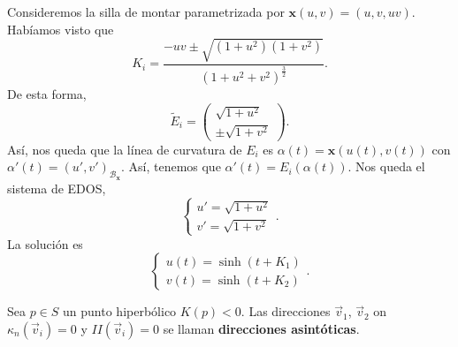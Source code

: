 \begin{eg}
Consideremos la silla de montar parametrizada por $\displaystyle \textbf{x} \left(u,v\right)=\left(u,v,uv\right) $. Habíamos visto que 
\[K_{i}=\frac{-uv \pm \sqrt{\left(1 + u^{2}\right)\left(1 + v^{2}\right)}}{\left(1 + u^{2}+v^{2}\right)^{\frac{3}{2}}} .\]
De esta forma, 
\[\tilde{E}_{i}=\begin{pmatrix} \sqrt{1 + u^{2}} \\ \pm \sqrt{1 + v^{2}} \end{pmatrix} .\]
Así, nos queda que la línea de curvatura de $\displaystyle E_{i} $ es $\displaystyle \alpha\left(t\right)= \textbf{x} \left(u\left(t\right), v\left(t\right)\right) $ con $\displaystyle \alpha'\left(t\right)=\left(u', v'\right)_{\mathcal{B}_{ \textbf{x} }} $. Así, tenemos que $\displaystyle \alpha'\left(t\right)=E_{i}\left(\alpha \left(t\right)\right) $. Nos queda el sistema de EDOS, 
\[
\begin{cases}
u' = \sqrt{1 + u^{2}} \\
v' = \sqrt{1 + v^{2}}
\end{cases}
.\]
La solución es
\[
\begin{cases}
u\left(t\right)=\sinh\left(t + K_{1}\right) \\
v\left(t\right)=\sinh\left(t + K_{2}\right)
\end{cases}
.\]
\end{eg}
\begin{definition}
Sea $\displaystyle p \in S $ un punto hiperbólico $\displaystyle K\left(p\right)<0 $. Las direcciones $\displaystyle \vec{v}_{1} $, $\displaystyle \vec{v}_{2} $ on $\displaystyle \kappa_{n}\left(\vec{v}_{i}\right)=0 $ y $\displaystyle II\left(\vec{v}_{i}\right)=0 $ se llaman \textbf{direcciones asintóticas}. 
\end{definition}
